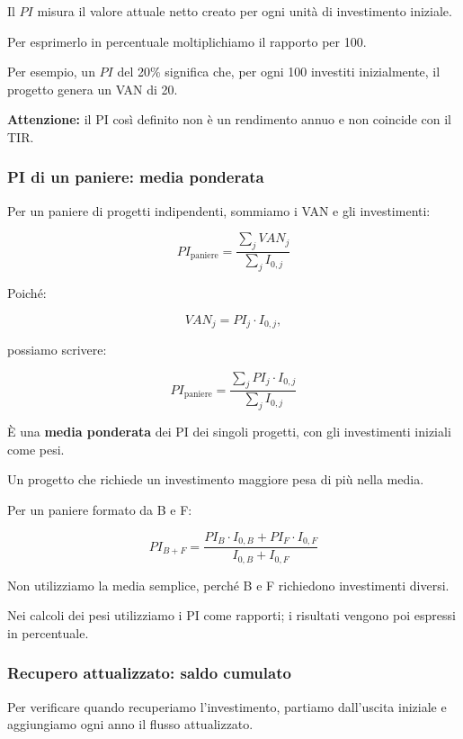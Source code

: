 \noindent Il $PI$ misura il valore attuale
netto creato per ogni unità
di investimento iniziale.

\noindent Per esprimerlo in percentuale
moltiplichiamo il rapporto per 100.

\medskip

\noindent Per esempio,
un $PI$ del 20\% significa che,
per ogni 100 investiti inizialmente,
il progetto genera un VAN di 20.

\noindent \textbf{Attenzione:}
il PI così definito
non è un rendimento annuo
e non coincide con il TIR.


\subsubsection*{PI di un paniere:
media ponderata}

\noindent Per un paniere di progetti indipendenti,
sommiamo i VAN e gli investimenti:

\[
\boxed{
PI_{\text{paniere}}
=
\frac{\sum_j VAN_j}{\sum_j I_{0,j}}
}
\]

\noindent Poiché:

\[
VAN_j=PI_j\cdot I_{0,j},
\]

\noindent possiamo scrivere:

\[
\boxed{
PI_{\text{paniere}}
=
\frac{
\sum_j PI_j\cdot I_{0,j}
}{
\sum_j I_{0,j}
}
}
\]

\noindent È una \textbf{media ponderata}
dei PI dei singoli progetti,
con gli investimenti iniziali come pesi.

\noindent Un progetto che richiede
un investimento maggiore
pesa di più nella media.

\medskip

\noindent Per un paniere formato da B e F:

\[
\boxed{
PI_{B+F}
=
\frac{
PI_B\cdot I_{0,B}
+
PI_F\cdot I_{0,F}
}{
I_{0,B}+I_{0,F}
}
}
\]

\noindent Non utilizziamo la media semplice,
perché B e F richiedono investimenti diversi.

\noindent Nei calcoli dei pesi utilizziamo
i PI come rapporti;
i risultati vengono poi espressi in percentuale.


\subsubsection*{Recupero attualizzato:
saldo cumulato}

\noindent Per verificare quando recuperiamo
l'investimento,
partiamo dall'uscita iniziale
e aggiungiamo ogni anno
il flusso attualizzato.

